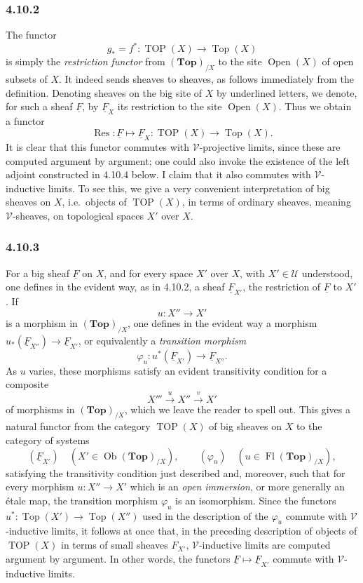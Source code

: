 \documentclass[11pt]{article}
\newcommand{\U}{\mathcal{U}}
\newcommand{\V}{\mathcal{V}}
\newcommand{\Esp}{\mathbf{Top}}
\newcommand{\Top}{\operatorname{Top}}
\newcommand{\TOP}{\operatorname{TOP}}
\newcommand{\Open}{\operatorname{Open}}
\newcommand{\Ob}{\operatorname{Ob}}
\newcommand{\Fl}{\operatorname{Fl}}
\newcommand{\Res}{\operatorname{Res}}
\newcommand{\ie}{i.e.}
\begin{document}
\subsubsection*{4.10.2}
The functor
\[
g_\ast=f^\ast:\TOP(X)\longrightarrow\Top(X)
\]
is simply the \emph{restriction functor} from \((\Esp)_{/X}\) to the site \(\Open(X)\) of open subsets of \(X\). It indeed sends sheaves to sheaves, as follows immediately from the definition. Denoting sheaves on the big site of \(X\) by underlined letters, we denote, for such a sheaf \(\underline F\), by \(\underline F_X\) its restriction to the site \(\Open(X)\). Thus we obtain a functor
\[
\Res:\underline F\longmapsto \underline F_X:
\TOP(X)\longrightarrow\Top(X).\tag{4.10.2.1}
\]
It is clear that this functor commutes with \(\V\)-projective limits, since these are computed argument by argument; one could also invoke the existence of the left adjoint constructed in 4.10.4 below. I claim that it also commutes with \(\V\)-inductive limits. To see this, we give a very convenient interpretation of big sheaves on \(X\), \ie\ objects of \(\TOP(X)\), in terms of ordinary sheaves, meaning \(\V\)-sheaves, on topological spaces \(X'\) over \(X\).

\subsubsection*{4.10.3}
For a big sheaf \(\underline F\) on \(X\), and for every space \(X'\) over \(X\), with \(X'\in\U\) understood, one defines in the evident way, as in 4.10.2, a sheaf \(\underline F_{X'}\), the restriction of \(\underline F\) to \(X'\). If
\[
u:X''\longrightarrow X'
\]
is a morphism in \((\Esp)_{/X}\), one defines in the evident way a morphism \(u_\ast(\underline F_{X''})\to\underline F_{X'}\), or equivalently a \emph{transition morphism}
\[
\varphi_u:u^\ast(\underline F_{X'})\longrightarrow\underline F_{X''}.\tag{4.10.3.1}
\]
As \(u\) varies, these morphisms satisfy an evident transitivity condition for a composite
\[
X'''\xrightarrow{u}X''\xrightarrow{v}X'
\]
of morphisms in \((\Esp)_{/X}\), which we leave the reader to spell out. This gives a natural functor from the category \(\TOP(X)\) of big sheaves on \(X\) to the category of systems
\[
(\underline F_{X'})\quad(X'\in\Ob(\Esp)_{/X}),
\qquad
(\varphi_u)\quad(u\in\Fl(\Esp)_{/X}),
\]
satisfying the transitivity condition just described and, moreover, such that for every morphism \(u:X''\to X'\) which is an \emph{open immersion}, or more generally an \'etale map, the transition morphism \(\varphi_u\) is an isomorphism. Since the functors \(u^\ast:\Top(X')\to\Top(X'')\) used in the description of the \(\varphi_u\) commute with \(\V\)-inductive limits, it follows at once that, in the preceding description of objects of \(\TOP(X)\) in terms of small sheaves \(F_{X'}\), \(\V\)-inductive limits are computed argument by argument. In other words, the functors \(\underline F\mapsto\underline F_{X'}\) commute with \(\V\)-inductive limits.
\end{document}
